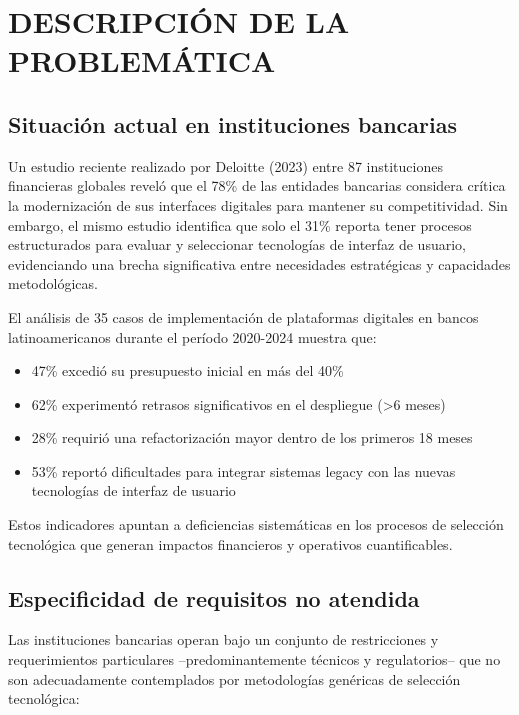 \section{DESCRIPCIÓN DE LA PROBLEMÁTICA}


\subsection*{Situación actual en instituciones bancarias}

Un estudio reciente realizado por Deloitte (2023) entre 87 instituciones
financieras globales reveló que el 78\% de las entidades bancarias considera
crítica la modernización de sus interfaces digitales para mantener su
competitividad. Sin embargo, el mismo estudio identifica que solo el 31\%
reporta tener procesos estructurados para evaluar y seleccionar tecnologías
de interfaz de usuario, evidenciando una brecha significativa entre
necesidades estratégicas y capacidades metodológicas.

El análisis de 35 casos de implementación de plataformas digitales en bancos
latinoamericanos durante el período 2020-2024 muestra que:

\begin{itemize}
  \item 47\% excedió su presupuesto inicial en más del 40\%
  \item 62\% experimentó retrasos significativos en el despliegue (>6 meses)
  \item 28\% requirió una refactorización mayor dentro de los primeros 18 meses
  \item 53\% reportó dificultades para integrar sistemas legacy con las nuevas
        tecnologías de interfaz de usuario
\end{itemize}

Estos indicadores apuntan a deficiencias sistemáticas en los procesos de
selección tecnológica que generan impactos financieros y operativos
cuantificables.

\subsection*{Especificidad de requisitos no atendida}

Las instituciones bancarias operan bajo un conjunto de restricciones y
requerimientos particulares --predominantemente técnicos y regulatorios--
que no son adecuadamente contemplados por metodologías genéricas de
selección tecnológica:

